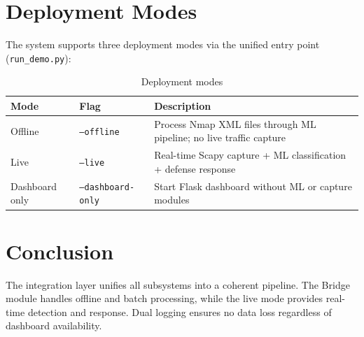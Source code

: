 \section{Deployment Modes}

The system supports three deployment modes via the unified entry point (\texttt{run\_demo.py}):

\begin{table}[H]
\centering
\caption{Deployment modes}
\label{tab:deploy_modes}
\begin{tabular}{llp{6cm}}
\toprule
\textbf{Mode} & \textbf{Flag} & \textbf{Description} \\
\midrule
Offline & \texttt{--offline} & Process Nmap XML files through ML pipeline; no live traffic capture \\
Live & \texttt{--live} & Real-time Scapy capture + ML classification + defense response \\
Dashboard only & \texttt{--dashboard-only} & Start Flask dashboard without ML or capture modules \\
\bottomrule
\end{tabular}
\end{table}

\section{Conclusion}

The integration layer unifies all subsystems into a coherent pipeline. The Bridge module handles offline and batch processing, while the live mode provides real-time detection and response. Dual logging ensures no data loss regardless of dashboard availability.
